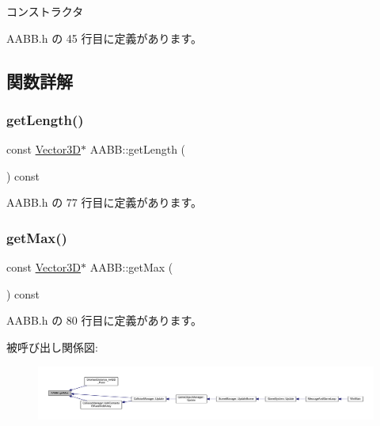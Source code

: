コンストラクタ 



 A\+A\+B\+B.\+h の 45 行目に定義があります。



\subsection{関数詳解}
\mbox{\label{class_a_a_b_b_a74b2c6a6acde4bf37eb0333358349fca}} 
\subsubsection{\texorpdfstring{get\+Length()}{getLength()}}
{\footnotesize\ttfamily const \mbox{\hyperlink{class_vector3_d}{Vector3D}}$\ast$ A\+A\+B\+B\+::get\+Length (\begin{DoxyParamCaption}{ }\end{DoxyParamCaption}) const\hspace{0.3cm}{\ttfamily [inline]}}



 A\+A\+B\+B.\+h の 77 行目に定義があります。

\mbox{\label{class_a_a_b_b_a8dc63902fbb2c8f83185bbe9feaaa4b0}} 
\subsubsection{\texorpdfstring{get\+Max()}{getMax()}}
{\footnotesize\ttfamily const \mbox{\hyperlink{class_vector3_d}{Vector3D}}$\ast$ A\+A\+B\+B\+::get\+Max (\begin{DoxyParamCaption}{ }\end{DoxyParamCaption}) const\hspace{0.3cm}{\ttfamily [inline]}}



 A\+A\+B\+B.\+h の 80 行目に定義があります。

被呼び出し関係図\+:
\nopagebreak
\begin{figure}[H]
\begin{center}
\leavevmode
\includegraphics[width=350pt]{class_a_a_b_b_a8dc63902fbb2c8f83185bbe9feaaa4b0_icgraph}
\end{center}
\end{figure}
\mbox{\label{class_a_a_b_b_a9a18cef6c33dd579c144700c79ea39f5}} 
